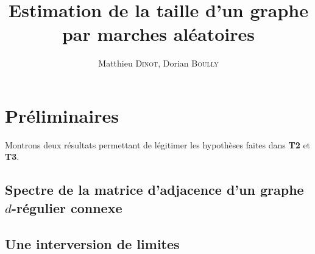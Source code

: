 \documentclass[11pt]{article}
\title{Estimation de la taille d'un graphe par marches aléatoires}
\author{Matthieu \textsc{Dinot}, Dorian \textsc{Boully}}
\date{}
\begin{document}
\maketitle
\section*{Préliminaires}
Montrons deux résultats permettant de légitimer les hypothèses faites dans \textbf{T2} et \textbf{T3}.
\subsection*{Spectre de la matrice d'adjacence d'un graphe $d$-régulier connexe}
\subsection*{Une interversion de limites}
\end{document}
